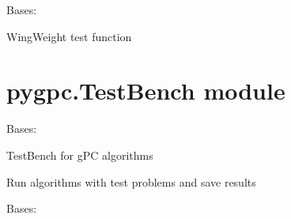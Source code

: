 \documentclass[letterpaper,10pt,english,openany,oneside]{sphinxmanual}
\begin{document}

\begin{fulllineitems}
\label{\detokenize{pygpc:pygpc.Test.WingWeight}}
Bases: {\hyperref[\detokenize{pygpc:pygpc.Test.Test}]{}}

WingWeight test function

\end{fulllineitems}



\section{pygpc.TestBench module}
\label{\detokenize{pygpc:module-pygpc.TestBench}}\label{\detokenize{pygpc:pygpc-testbench-module}}

\begin{fulllineitems}
\label{\detokenize{pygpc:pygpc.TestBench.TestBench}}
Bases: 

TestBench for gPC algorithms

\begin{fulllineitems}
\label{\detokenize{pygpc:pygpc.TestBench.TestBench.run}}
Run algorithms with test problems and save results

\end{fulllineitems}


\end{fulllineitems}


\begin{fulllineitems}
\label{\detokenize{pygpc:pygpc.TestBench.TestBenchContinuous}}
Bases: {\hyperref[\detokenize{pygpc:pygpc.TestBench.TestBench}]{}}

\end{fulllineitems}
\end{document}
